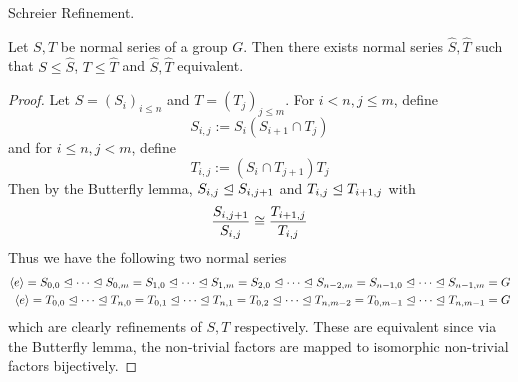 \documentclass[../../book.tex]{subfiles}
\begin{document}
\begin{thm} Schreier Refinement. 
    
    Let $S, T$ be normal series of a group $G$. 
    Then there exists normal series $\hat{S}, \hat{T}$ such that
    $S \leq \hat{S}$, $T \leq \hat{T}$ and $\hat{S}, \hat{T}$ equivalent. 
    
\end{thm}
\begin{proof}
    
    Let $S = (S_i)_{i \leq n}$ and $T = (T_j)_{j \leq m}$. 
    For $i < n, j \leq m$, define \[
        S_{i,j} := S_i (S_{i+1} \cap T_j)
    \]
    and for $i \leq n, j < m$, define \[
        T_{i,j} := (S_{i} \cap T_{j+1}) T_j
    \]
    Then by the Butterfly lemma, 
    $S_{i,j} \trianglelefteq S_{i,j+1}$ and $T_{i,j} \trianglelefteq T_{i+1,j}$
    with \[
        \frac{S_{i,j+1}}{S_{i,j}} \cong \frac{T_{i+1,j}}{T_{i,j}}
    \]
    Thus we have the following two normal series \begin{align*}
        \langle e\rangle = S_{0,0} \trianglelefteq \cdots \trianglelefteq S_{0,m} 
        = S_{1,0} \trianglelefteq \cdots \trianglelefteq S_{1,m}
        = S_{2,0} \trianglelefteq \cdots \trianglelefteq S_{n-2,m}
        = S_{n-1,0} \trianglelefteq \cdots \trianglelefteq S_{n-1,m} = G
        \\
        \langle e\rangle = T_{0,0} \trianglelefteq \cdots \trianglelefteq T_{n,0} 
        = T_{0,1} \trianglelefteq \cdots \trianglelefteq T_{n,1} 
        = T_{0,2}\trianglelefteq \cdots \trianglelefteq T_{n,m-2}
        = T_{0,m-1} \trianglelefteq \cdots \trianglelefteq T_{n,m-1} = G
    \end{align*}
    which are clearly refinements of $S, T$ respectively.
    These are equivalent since via the Butterfly lemma, 
    the non-trivial factors are mapped to isomorphic non-trivial factors bijectively.
    
\end{proof}
\end{document}
